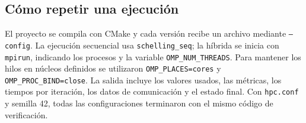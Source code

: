\subsection{Cómo repetir una ejecución}

El proyecto se compila con CMake y cada versión recibe un archivo mediante \texttt{--config}. La ejecución secuencial usa \texttt{schelling\_seq}; la híbrida se inicia con \texttt{mpirun}, indicando los procesos y la variable \texttt{OMP\_NUM\_THREADS}. Para mantener los hilos en núcleos definidos se utilizaron \texttt{OMP\_PLACES=cores} y \texttt{OMP\_PROC\_BIND=close}. La salida incluye los valores usados, las métricas, los tiempos por iteración, los datos de comunicación y el estado final. Con \texttt{hpc.conf} y semilla 42, todas las configuraciones terminaron con el mismo código de verificación.

